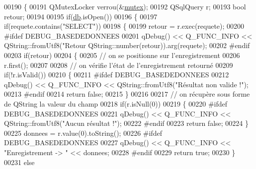 \begin{DoxyCode}
00190 \{
00191     QMutexLocker verrou(&\hyperlink{class_base_de_donnees_aa1b4696fac87a740f914aa73739086f2}{mutex});
00192     QSqlQuery r;
00193     \textcolor{keywordtype}{bool} retour;
00194 
00195     \textcolor{keywordflow}{if}(\hyperlink{class_base_de_donnees_a3e738dcf443370c46a541677ab619f06}{db}.isOpen())
00196     \{
00197         \textcolor{keywordflow}{if}(requete.contains(\textcolor{stringliteral}{"SELECT"}))
00198         \{
00199             retour = r.exec(requete);
00200 \textcolor{preprocessor}{            #ifdef DEBUG\_BASEDEDONNEES}
00201             qDebug() << Q\_FUNC\_INFO << QString::fromUtf8(\textcolor{stringliteral}{"Retour %
      QString::number(retour)).arg(requete);
00202 \textcolor{preprocessor}{            #endif}
00203             \textcolor{keywordflow}{if}(retour)
00204             \{
00205                 \textcolor{comment}{// on se positionne sur l'enregistrement}
00206                 r.first();
00207 
00208                 \textcolor{comment}{// on vérifie l'état de l'enregistrement retourné}
00209                 \textcolor{keywordflow}{if}(!r.isValid())
00210                 \{
00211 \textcolor{preprocessor}{                    #ifdef DEBUG\_BASEDEDONNEES}
00212                     qDebug() << Q\_FUNC\_INFO << QString::fromUtf8(\textcolor{stringliteral}{"Résultat non valide !"});
00213 \textcolor{preprocessor}{                    #endif}
00214                     \textcolor{keywordflow}{return} \textcolor{keyword}{false};
00215                 \}
00216 
00217                 \textcolor{comment}{// on récupère sous forme de QString la valeur du champ}
00218                 \textcolor{keywordflow}{if}(r.isNull(0))
00219                 \{
00220 \textcolor{preprocessor}{                    #ifdef DEBUG\_BASEDEDONNEES}
00221                     qDebug() << Q\_FUNC\_INFO << QString::fromUtf8(\textcolor{stringliteral}{"Aucun résultat !"});
00222 \textcolor{preprocessor}{                    #endif}
00223                     \textcolor{keywordflow}{return} \textcolor{keyword}{false};
00224                 \}
00225                 donnees = r.value(0).toString();
00226 \textcolor{preprocessor}{                #ifdef DEBUG\_BASEDEDONNEES}
00227                 qDebug() << Q\_FUNC\_INFO << \textcolor{stringliteral}{"Enregistrement -> "} << donnees;
00228 \textcolor{preprocessor}{                #endif}
00229                 \textcolor{keywordflow}{return} \textcolor{keyword}{true};
00230             \}
00231             \textcolor{keywordflow}{else}
}
\end{DoxyCode}
